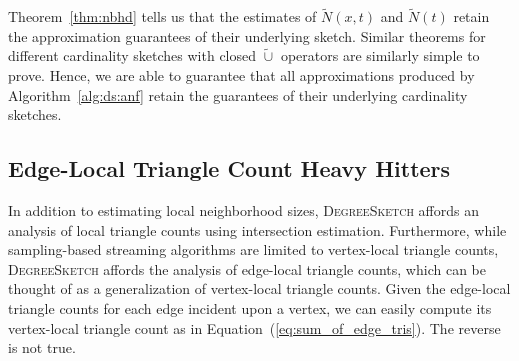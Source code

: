 \documentclass{vldb}
\newcommand{\algoname}[1]{\textnormal{\textsc{#1}}}
\begin{document}
Theorem~\ref{thm:nbhd} tells us that the estimates of $\widetilde{N}(x, t)$ and $\widetilde{N}(t)$ retain the approximation guarantees of their underlying sketch.
Similar theorems for different cardinality sketches with closed $\widetilde{\cup}$ operators are similarly simple to prove. 
Hence, we are able to guarantee that all approximations produced by Algorithm~\ref{alg:ds:anf} retain the guarantees of their underlying cardinality sketches.





\subsection{Edge-Local Triangle Count Heavy Hitters}
 \label{sec:edge_triangles}

In addition to estimating local neighborhood sizes, \algoname{DegreeSketch} affords an analysis of local triangle counts using intersection estimation. 
Furthermore, while sampling-based streaming algorithms are limited to vertex-local triangle counts, \algoname{DegreeSketch} affords the analysis of edge-local triangle counts, which 
can be thought of as a generalization of vertex-local triangle counts. 
Given the edge-local triangle counts for each edge incident upon a vertex, we can easily compute its vertex-local triangle count as in Equation~(\ref{eq:sum_of_edge_tris}).
The reverse is not true. 
\end{document}
